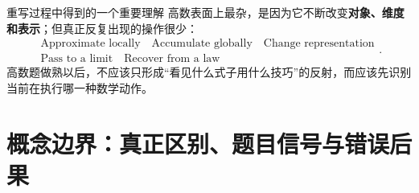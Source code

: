 \documentclass[11pt,a4paper,openany]{ctexbook}
\newcommand{\key}[1]{\textbf{\color{deep}#1}}
\begin{document}
\begin{corebox}{重写过程中得到的一个重要理解}
高数表面上最杂，是因为它不断改变\key{对象、维度和表示}；但真正反复出现的操作很少：
\[
\boxed{\begin{gathered}\text{Approximate locally}\quad\text{Accumulate globally}\quad\text{Change representation}\\\text{Pass to a limit}\quad\text{Recover from a law}\end{gathered}}.
\]
高数题做熟以后，不应该只形成“看见什么式子用什么技巧”的反射，而应该先识别当前在执行哪一种数学动作。
\end{corebox}

\chapter{概念边界：真正区别、题目信号与错误后果}
\end{document}
